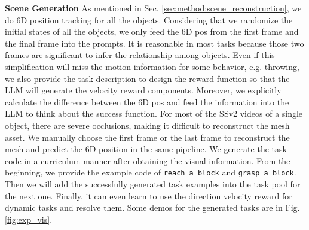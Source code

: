 \textbf{Scene Generation} As mentioned in Sec. \ref{sec:method:scene_reconstruction}, we do 6D position tracking for all the objects. Considering that we randomize the initial states of all the objects, we only feed the 6D pos from the first frame and the final frame into the prompts. It is reasonable in most tasks because those two frames are significant to infer the relationship among objects. Even if this simplification will miss the motion information for some behavior, e.g. throwing, we also provide the task description to design the reward function so that the LLM will generate the velocity reward components. Moreover, we explicitly calculate the difference between the 6D pos and feed the information into the LLM to think about the success function. For most of the SSv2 videos of a single object, there are severe occlusions, making it difficult to reconstruct the mesh asset. We manually choose the first frame or the last frame to reconstruct the mesh and predict the 6D position in the same pipeline. We generate the task code in a curriculum manner \citep{ma2023eureka, wang2023gensim} after obtaining the visual information. From the beginning, we provide the example code of \texttt{reach a block} and \texttt{grasp a block}. Then we will add the successfully generated task examples into the task pool for the next one. Finally, it can even learn to use the direction velocity reward for dynamic tasks and resolve them. Some demos for the generated tasks are in Fig. \ref{fig:exp_vis}. 

